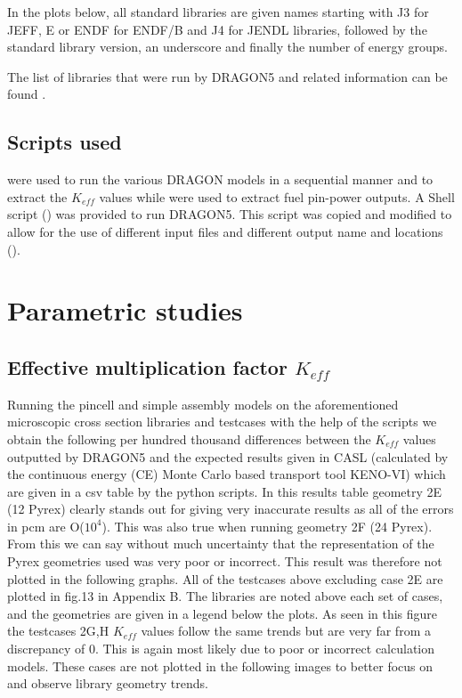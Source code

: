 \documentclass[12pt]{article}
\begin{document}
In the plots below, all standard libraries are given names starting with J3 for JEFF, E or ENDF for ENDF/B and J4 for JENDL libraries, followed by the standard library version, an underscore and finally the number of energy groups.

The list of libraries that were run by DRAGON5 and related information can be found \href{https://github.com/alex-stuart/LRS_internship_repo/tree/main/dragon/Libs}{\color{blue}{here}}.

\subsection{Scripts used}

\href{https://github.com/alex-stuart/LRS_internship_repo/tree/main/dragon/scripts}{\color{blue}{Python scripts}} were used to run the various DRAGON models in a sequential manner and to extract the $K_{eff}$ values while \href{https://github.com/alex-stuart/LRS_internship_repo/tree/main/MatLab}{\color{blue}{Matlab scripts}} were used to extract fuel pin-power outputs. A Shell script (\href{https://github.com/alex-stuart/LRS_internship_repo/blob/main/bin/rdragon5}{\color{blue}{rdragon5}}) was provided to run DRAGON5. This script was copied and modified to allow for the use of different input files and different output name and locations (\href{https://github.com/alex-stuart/LRS_internship_repo/blob/main/bin/rdragon6}{\color{blue}{rdragon6}}).

\section{Parametric studies}

\subsection{Effective multiplication factor $K_{eff}$}

Running the pincell and simple assembly models on the aforementioned microscopic cross section libraries and testcases with the help of the scripts we obtain the following per hundred thousand differences between the $K_{eff}$ values outputted by DRAGON5 and the expected results given in CASL (calculated by the continuous energy (CE) Monte Carlo based transport tool KENO-VI) which are given in a csv table by the python scripts. In this results table geometry 2E (12 Pyrex) clearly stands out for giving very inaccurate results as all of the errors in pcm are O($10^4$). This was also true when running geometry 2F (24 Pyrex). From this we can say without much uncertainty that the representation of the Pyrex geometries used was very poor or incorrect. This result was therefore not plotted in the following graphs. All of the testcases above excluding case 2E are plotted in fig.13 in Appendix B. The libraries are noted above each set of cases, and the geometries are given in a legend below the plots. As seen in this figure the testcases 2G,H $K_{eff}$ values follow the same trends but are very far from a discrepancy of 0. This is again most likely due to poor or incorrect calculation models. These cases are not plotted in the following images to better focus on and observe library geometry trends.
\end{document}
